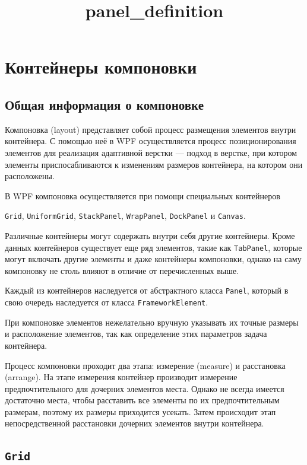 \section{Контейнеры компоновки}

\graphicspath{{parts/guides/2_managers/images/}}

\subsection{Общая информация о компоновке} \title{panel_definition}

Компоновка (layout) представляет собой процесс размещения элементов внутри контейнера. С помощью неё в WPF осуществляется процесс позиционирования элементов для реализация адаптивной верстки — подход в верстке, при котором элементы приспосабливаются к изменениям размеров контейнера, на котором они расположены.

В WPF компоновка осуществляется при помощи специальных контейнеров

\texttt{Grid}, \texttt{UniformGrid}, \texttt{StackPanel}, \texttt{WrapPanel}, \texttt{DockPanel} и \texttt{Canvas}.

Различные контейнеры могут содержать внутри себя другие контейнеры. Кроме данных контейнеров существует еще ряд элементов, такие как \texttt{TabPanel}, которые могут включать другие элементы и даже контейнеры компоновки, однако на саму компоновку не столь влияют в отличие от перечисленных выше.

Каждый из контейнеров наследуется от абстрактного класса \texttt{Panel}, который в свою очередь наследуется от класса \texttt{FrameworkElement}.

При компоновке элементов нежелательно вручную указывать их точные размеры и расположение элементов, так как определение этих параметров задача контейнера.

Процесс компоновки проходит два этапа: измерение (measure) и расстановка (arrange). На этапе измерения контейнер производит измерение предпочтительного для дочерних элементов места. Однако не всегда имеется достаточно места, чтобы расставить все элементы по их предпочтительным размерам, поэтому их размеры приходится усекать. Затем происходит этап непосредственной расстановки дочерних элементов внутри контейнера.

\subsection{\texttt{Grid}} \label{Grid_defenition}

